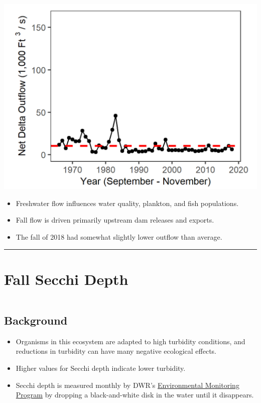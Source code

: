 \documentclass[
]{book}
\providecommand{\tightlist}{%
  \setlength{\itemsep}{0pt}\setlength{\parskip}{0pt}}
\begin{document}
\includegraphics[width=15.25in]{figures/fall_outflow_update}

\begin{itemize}
\tightlist
\item
  Freshwater flow influences water quality, plankton, and fish populations.
\item
  Fall flow is driven primarily upstream dam releases and exports.
\item
  The fall of 2018 had somewhat slightly lower outflow than average.
\end{itemize}

\begin{center}\rule{0.5\linewidth}{0.5pt}\end{center}

\hypertarget{fall-secchi-depth}{%
\section{Fall Secchi Depth}\label{fall-secchi-depth}}

\begin{column}{0.7\textwidth}
\hypertarget{background-12}{%
\subsection{Background}\label{background-12}}

\begin{itemize}
\tightlist
\item
  Organisms in this ecosystem are adapted to high turbidity conditions, and reductions in turbidity can have many negative ecological effects.
\item
  Higher values for Secchi depth indicate lower turbidity.
\item
  Secchi depth is measured monthly by DWR's \href{https://emp.baydeltalive.com/wiki/12297}{Environmental Monitoring Program} by dropping a black-and-white disk in the water until it disappears.
\end{itemize}
\end{column}
\end{document}
